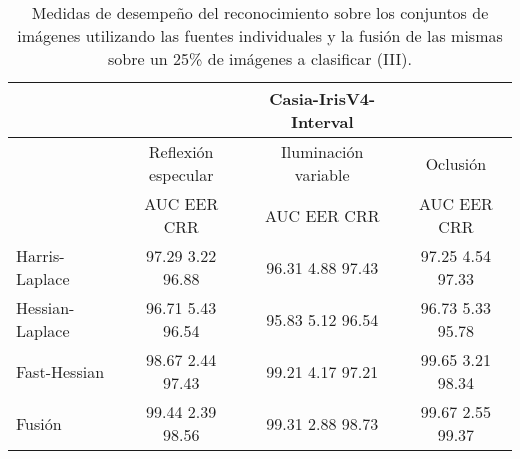 \begin{table}[h]
\begin{center}
\begin{tabular}{@{}lccc@{}}
\toprule
&& Casia-IrisV4-Interval & \\ \hline
&Reflexión especular		&  	Iluminación variable		& Oclusión \\ \hline
&AUC  \phantom{aa} EER  \phantom{aa} CRR &  	AUC  \phantom{aa} EER  \phantom{aa} CRR		& AUC  \phantom{aa} EER  \phantom{aa} CRR \\ \hline
Harris-Laplace& 97.29 \phantom{aa} 3.22  \phantom{aa} 96.88 &  	96.31 \phantom{aa} 4.88  \phantom{aa}97.43		& 97.25 \phantom{aa} 4.54 \phantom{aa} 97.33 \\
Hessian-Laplace& 96.71 \phantom{aa} 5.43  \phantom{aa} 96.54 &  	95.83 \phantom{aa} 5.12 \phantom{aa} 96.54 & 96.73 \phantom{aa} 5.33 \phantom{aa} 95.78\\
Fast-Hessian& 98.67  \phantom{aa}2.44 \phantom{aa}  97.43 &  	99.21 \phantom{aa} 4.17 \phantom{aa}97.21		& 99.65  \phantom{aa}3.21 \phantom{aa} 98.34 \\
Fusión& 99.44 \phantom{aa} 2.39  \phantom{aa}98.56 &  	99.31  \phantom{aa}2.88 \phantom{aa} 98.73		& 99.67 \phantom{aa} 2.55  \phantom{aa}99.37 \\ \hline

\end{tabular}
\end{center}
\caption{Medidas de desempeño del reconocimiento sobre los conjuntos de imágenes utilizando las fuentes individuales y la fusión de las mismas sobre un 25\% de imágenes a clasificar (III).}
\label{my_tabla}
\end{table}

\newpage

